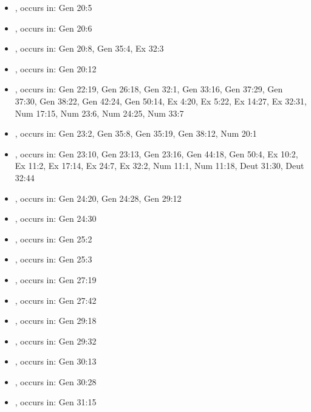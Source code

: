 \documentclass[14pt]{article}
\begin{document}
\begin{itemize}
\item {}, occurs in: Gen 20:5

\item {}, occurs in: Gen 20:6

\item {}, occurs in: Gen 20:8, Gen 35:4, Ex 32:3

\item {}, occurs in: Gen 20:12

\item {}, occurs in: Gen 22:19, Gen 26:18, Gen 32:1, Gen 33:16, Gen 37:29, Gen 37:30, Gen 38:22, Gen 42:24, Gen 50:14, Ex 4:20, Ex 5:22, Ex 14:27, Ex 32:31, Num 17:15, Num 23:6, Num 24:25, Num 33:7

\item {}, occurs in: Gen 23:2, Gen 35:8, Gen 35:19, Gen 38:12, Num 20:1

\item {}, occurs in: Gen 23:10, Gen 23:13, Gen 23:16, Gen 44:18, Gen 50:4, Ex 10:2, Ex 11:2, Ex 17:14, Ex 24:7, Ex 32:2, Num 11:1, Num 11:18, Deut 31:30, Deut 32:44

\item {}, occurs in: Gen 24:20, Gen 24:28, Gen 29:12

\item {}, occurs in: Gen 24:30

\item {}, occurs in: Gen 25:2

\item {}, occurs in: Gen 25:3

\item {}, occurs in: Gen 27:19

\item {}, occurs in: Gen 27:42

\item {}, occurs in: Gen 29:18

\item {}, occurs in: Gen 29:32

\item {}, occurs in: Gen 30:13

\item {}, occurs in: Gen 30:28

\item {}, occurs in: Gen 31:15


\end{itemize}
\end{document}
